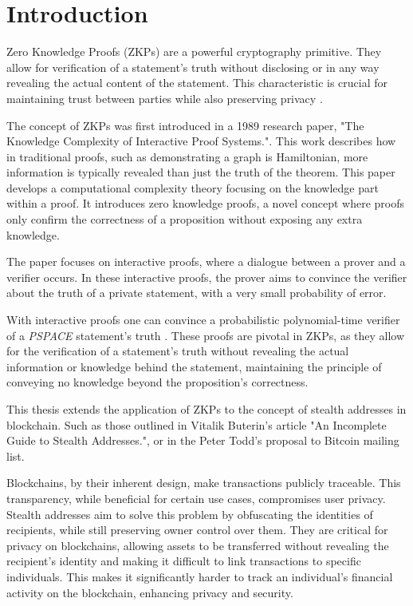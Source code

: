 \documentclass[conference,comsoc,10pt]{IEEEtran}
\begin{document}
\section{Introduction}
    Zero Knowledge Proofs (ZKPs) are a powerful cryptography primitive. They allow
    for verification of a statement's truth without disclosing or in any way revealing
    the actual content of the statement. This characteristic is crucial for
    maintaining trust between parties while also preserving privacy \cite{goldreich1991proofs}.

    The concept of ZKPs was first introduced in a 1989 research paper, "The
    Knowledge Complexity of Interactive Proof Systems."\cite{Goldwasser1989}.
    This work describes how in traditional proofs, such as demonstrating a graph
    is Hamiltonian, more information is typically revealed than just the truth of
    the theorem. This paper develops a computational complexity theory focusing
    on the knowledge part within a proof. It introduces zero knowledge proofs,
    a novel concept where proofs only confirm the correctness of a proposition
    without exposing any extra knowledge.

    The paper focuses on interactive proofs, where a dialogue between a prover and
    a verifier occurs. In these interactive proofs, the prover aims to convince
    the verifier about the truth of a private statement, with a very small
    probability of error.

    With interactive proofs one can convince a probabilistic polynomial-time verifier
    of a \emph{PSPACE} statement's truth \cite{Shamir1992, Lund1992}. These proofs
    are pivotal in ZKPs, as they allow for the verification of a statement's truth
    without revealing the actual information or knowledge behind the statement,
    maintaining the principle of conveying no knowledge beyond the proposition's
    correctness.

    This thesis extends the application of ZKPs to the concept of stealth
    addresses in blockchain. Such as those outlined in Vitalik Buterin's article "An
    Incomplete Guide to Stealth Addresses."\cite{ButerinIncompleteGuide}, or
    in the Peter Todd's proposal to Bitcoin mailing list\cite{ToddStealthAddresses}.

    Blockchains, by their inherent design, make transactions publicly
    traceable. This transparency, while beneficial for certain use cases,
    compromises user privacy. Stealth addresses aim to solve this problem by
    obfuscating the identities of recipients, while still preserving owner
    control over them.
    They are critical for privacy on blockchains, allowing assets to
    be transferred without revealing the recipient's identity and making
    it difficult to link transactions to specific individuals.
    This makes it significantly harder to track an individual's
    financial activity on the blockchain, enhancing privacy and security.
\end{document}
